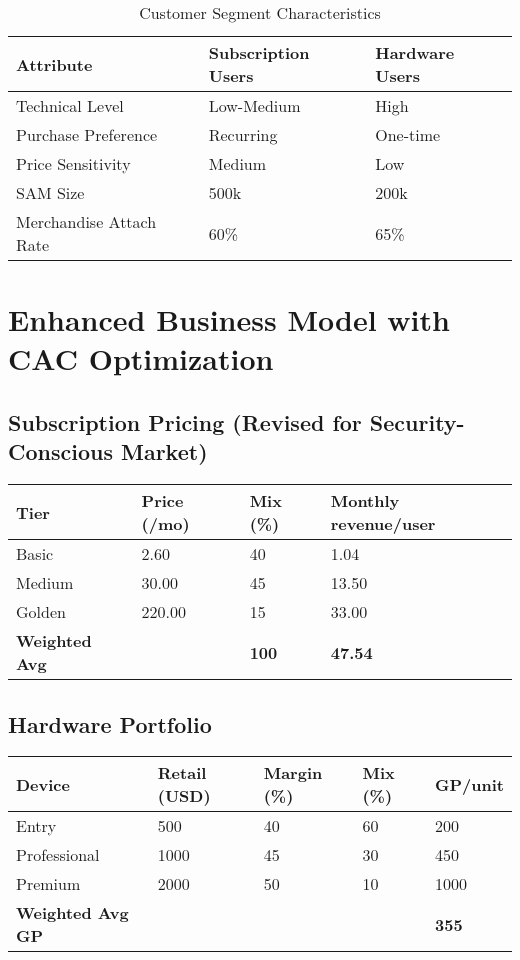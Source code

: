 \documentclass[11pt]{article}
\begin{document}
\begin{table}[H]
\centering
\caption{Customer Segment Characteristics}
\begin{tabularx}{\linewidth}{l X X}
\toprule
Attribute & Subscription Users & Hardware Users \\\midrule
Technical Level & Low-Medium & High \\
Purchase Preference & Recurring & One-time \\
Price Sensitivity & Medium & Low \\
SAM Size & 500k\cite{chainalysis2024,triple2023} & 200k\cite{chainalysis2024,triple2023} \\
Merchandise Attach Rate & 60\%\cite{shopify2024} & 65\%\cite{shopify2024} \\
\bottomrule
\end{tabularx}
\end{table}

\section{Enhanced Business Model with CAC Optimization}

\subsection{Subscription Pricing (Revised for Security-Conscious Market)}
\begin{table}[H]
\centering
\begin{tabularx}{\linewidth}{l Y Y Y}
\toprule
Tier & Price (/mo) & Mix (\%) & Monthly revenue/user \\\midrule
Basic   & 2.60  & 40 & 1.04 \\
Medium  & 30.00 & 45 & 13.50 \\
Golden  & 220.00& 15 & 33.00 \\\midrule
\textbf{Weighted Avg} &  & \textbf{100} & \textbf{47.54} \\
\bottomrule
\end{tabularx}
\end{table}

\subsection{Hardware Portfolio}
\begin{table}[H]
\centering
\begin{tabularx}{\linewidth}{l Y Y Y Y}
\toprule
Device & Retail (USD) & Margin (\%)\cite{industrybenchmark2024} & Mix (\%) & GP/unit \\\midrule
Entry        & 500  & 40 & 60 & 200 \\
Professional & 1000 & 45 & 30 & 450 \\
Premium      & 2000 & 50 & 10 & 1000 \\\midrule
\textbf{Weighted Avg GP} &  &  &  & \textbf{355} \\
\bottomrule
\end{tabularx}
\end{table}
\end{document}
